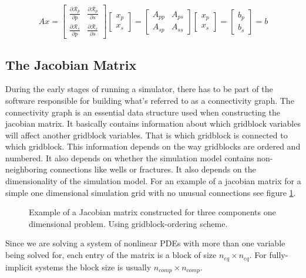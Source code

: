 \begin{equation}
	Ax = 
\begin{bmatrix}
	\frac{\partial\mathcal{R}_{p}}{\partial p}& \frac{\partial\mathcal{R}_{p}}{\partial s}\\
	\frac{\partial\mathcal{R}_{s}}{\partial p}& \frac{\partial\mathcal{R}_{s}}{\partial s}
\end{bmatrix}
\begin{bmatrix}
	x_{p} \\
	x_{s}
\end{bmatrix}
=
\begin{bmatrix}
	A_{pp} & A_{ps}\\
	A_{sp} & A_{ss}
\end{bmatrix}
\begin{bmatrix}
	x_{p} \\
	x_{s}
\end{bmatrix}
=
\begin{bmatrix}
	b_{p} \\
	b_{s}
\end{bmatrix}
=
b
\end{equation}

\subsection{The Jacobian Matrix}
During the early stages of running a simulator, there has to be part of the software responsible for
building what's referred to as a connectivity graph. The connectivity graph is an essential data structure used
when constructing the jacobian matrix. It basically contains information about which gridblock variables will affect
another gridblock variables. That is which gridblock is connected to which gridblock. This information depends on the
way gridblocks are ordered and numbered. It also depends on whether the simulation model contains non-neighboring connections
like wells or fractures. It also depends on the dimensionality of the simulation model. For an example of a jacobian matrix for a 
simple one dimensional simulation grid with no unusual connections see figure \ref{jacobian}.

\begin{figure}[H]
\resizebox{9.5cm}{!}{}
\caption{Example of a Jacobian matrix constructed for three components one dimensional problem. Using gridblock-ordering scheme.}
\label{jacobian}
\end{figure}
Since we are solving a system of nonlinear PDEs with more than one variable being solved for, each entry of the matrix is a block of size
$n_{eq}\times n_{eq}$. For fully-implicit systems the block size is usually $n_{comp}\times n_{comp}$.

